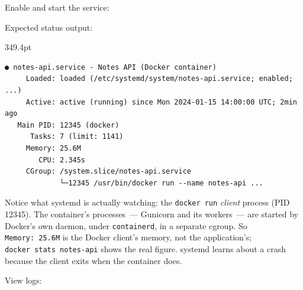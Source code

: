 Enable and start the service:

\begin{codebox}[short]

\begin{Shaded}
\begin{Highlighting}[]



\end{Highlighting}
\end{Shaded}

\end{codebox}

\noindent{}Expected status output:

\begin{diagrambox}[short]{349.4pt}
\begin{Verbatim}[fontsize=\fontsize{9.0}{8.55}\selectfont]
● notes-api.service - Notes API (Docker container)
     Loaded: loaded (/etc/systemd/system/notes-api.service; enabled; ...)
     Active: active (running) since Mon 2024-01-15 14:00:00 UTC; 2min ago
   Main PID: 12345 (docker)
      Tasks: 7 (limit: 1141)
     Memory: 25.6M
        CPU: 2.345s
     CGroup: /system.slice/notes-api.service
             └─12345 /usr/bin/docker run --name notes-api ...
\end{Verbatim}
\end{diagrambox}

\noindent{}Notice what systemd is actually watching: the \texttt{docker\ run} \emph{client} process (PID 12345). The container's processes~--- Gunicorn and its workers~--- are started by Docker's own daemon, under \texttt{containerd}, in a separate cgroup. So \texttt{Memory:\ 25.6M} is the Docker client's memory, not the application's; \texttt{docker\ stats\ notes-api} shows the real figure. systemd learns about a crash because the client exits when the container does.

View logs:

\begin{codebox}[short]

\begin{Shaded}
\begin{Highlighting}[]
         
    
\end{Highlighting}
\end{Shaded}

\end{codebox}

